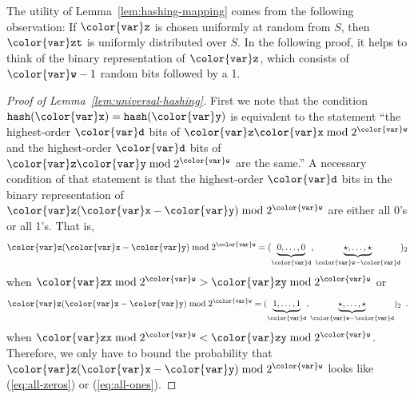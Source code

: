 \documentclass[10pt]{book}
\newcommand{\eqlabel}[1]{\label{eq:#1}}
\newcommand{\myeqref}[1]{(\ref{eq:#1})}
\theoremstyle{plain}
\newcommand{\lemref}[1]{Lemma~\ref{lem:#1}}
\theoremstyle{definition}
\begin{document}
The utility of \lemref{hashing-mapping} comes from the following
observation:  If \ensuremath{\mathtt{{\color{var}z}}} is chosen uniformly at random from $S$, then \ensuremath{\mathtt{{\color{var}zt}}}
is uniformly distributed over $S$.  In the following proof, it helps
to think of the binary representation of \ensuremath{\mathtt{{\color{var}z}}}, which consists of $\ensuremath{\mathtt{{\color{var}w}}}-1$
random bits followed by a 1.

\begin{proof}[Proof of \lemref{universal-hashing}]
  First we note that the condition $\ensuremath{\mathtt{hash({\color{var}x})}}=\ensuremath{\mathtt{hash({\color{var}y})}}$ is equivalent to
  the statement ``the highest-order \ensuremath{\mathtt{{\color{var}d}}} bits of $\ensuremath{\mathtt{{\color{var}z}}} \ensuremath{\mathtt{{\color{var}x}}}\bmod2^{\ensuremath{\mathtt{{\color{var}w}}}}$
  and the highest-order \ensuremath{\mathtt{{\color{var}d}}} bits of $\ensuremath{\mathtt{{\color{var}z}}} \ensuremath{\mathtt{{\color{var}y}}}\bmod 2^{\ensuremath{\mathtt{{\color{var}w}}}}$ are the same.''
  A necessary condition of that statement is that the highest-order
  \ensuremath{\mathtt{{\color{var}d}}} bits in the binary representation of $\ensuremath{\mathtt{{\color{var}z}}}(\ensuremath{\mathtt{{\color{var}x}}}-\ensuremath{\mathtt{{\color{var}y}}})\bmod 2^{\ensuremath{\mathtt{{\color{var}w}}}}$
  are either all 0's or all 1's.  That is,
  \begin{equation}
      \ensuremath{\mathtt{{\color{var}z}}}(\ensuremath{\mathtt{{\color{var}x}}}-\ensuremath{\mathtt{{\color{var}y}}})\bmod 2^{\ensuremath{\mathtt{{\color{var}w}}}} = 
      (\underbrace{0,\ldots,0}_{\ensuremath{\mathtt{{\color{var}d}}}},\underbrace{\star,\ldots,\star}_{\ensuremath{\mathtt{{\color{var}w}}}-\ensuremath{\mathtt{{\color{var}d}}}})_2 
      \eqlabel{all-zeros}
  \end{equation}
  when $\ensuremath{\mathtt{{\color{var}zx}}}\bmod 2^{\ensuremath{\mathtt{{\color{var}w}}}} > \ensuremath{\mathtt{{\color{var}zy}}}\bmod 2^{\ensuremath{\mathtt{{\color{var}w}}}}$ or
  \begin{equation}
      \ensuremath{\mathtt{{\color{var}z}}}(\ensuremath{\mathtt{{\color{var}x}}}-\ensuremath{\mathtt{{\color{var}y}}})\bmod 2^{\ensuremath{\mathtt{{\color{var}w}}}} = 
      (\underbrace{1,\ldots,1}_{\ensuremath{\mathtt{{\color{var}d}}}},\underbrace{\star,\ldots,\star}_{\ensuremath{\mathtt{{\color{var}w}}}-\ensuremath{\mathtt{{\color{var}d}}}})_2 
       \enspace .
      \eqlabel{all-ones}
  \end{equation}
  when $\ensuremath{\mathtt{{\color{var}zx}}}\bmod 2^{\ensuremath{\mathtt{{\color{var}w}}}} < \ensuremath{\mathtt{{\color{var}zy}}}\bmod 2^{\ensuremath{\mathtt{{\color{var}w}}}}$.
  Therefore, we only have to bound the probability that 
  $\ensuremath{\mathtt{{\color{var}z}}}(\ensuremath{\mathtt{{\color{var}x}}}-\ensuremath{\mathtt{{\color{var}y}}})\bmod 2^{\ensuremath{\mathtt{{\color{var}w}}}}$ looks like \myeqref{all-zeros} or \myeqref{all-ones}.
  

\end{proof}
\end{document}
